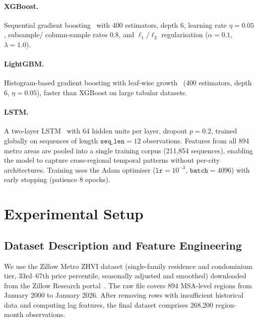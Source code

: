 \documentclass[runningheads]{llncs}
\begin{document}
\paragraph{XGBoost.}
Sequential gradient boosting~\cite{ref_chen_xgboost} with 400
estimators, depth 6, learning rate $\eta=0.05$, subsample/
column-sample rates 0.8, and $\ell_1/\ell_2$ regularisation
($\alpha=0.1$, $\lambda=1.0$).

\paragraph{LightGBM.}
Histogram-based gradient boosting with leaf-wise
growth~\cite{ref_ke_lgbm} (400 estimators, depth 6,
$\eta=0.05$), faster than XGBoost on large tabular datasets.

\paragraph{LSTM.}
A two-layer LSTM~\cite{ref_hochreiter1997} with 64 hidden units
per layer, dropout $p=0.2$, trained globally on sequences of
length $\mathtt{seq\_len}=12$ observations.
Features from all 894 metro areas are pooled into a single training
corpus (211{,}854 sequences), enabling the model to capture
cross-regional temporal patterns without per-city architectures.
Training uses the Adam optimiser ($\mathtt{lr}=10^{-3}$,
$\mathtt{batch}=4096$) with early stopping (patience 8 epochs).

\section{Experimental Setup}
\label{sec:setup}
\vspace{-0.3cm}

\subsection{Dataset Description and Feature Engineering}
\label{sec:data}
\vspace{-0.2cm}

We use the Zillow Metro ZHVI dataset (single-family residence and
condominium tier, 33rd--67th price percentile, seasonally adjusted
and smoothed) downloaded from the Zillow Research
portal~\cite{ref_zillow}. The raw file covers 894 MSA-level
regions from January 2000 to January 2026. After removing rows
with insufficient historical data and computing lag features, the final dataset comprises 268{,}200 region-month observations.
\end{document}
